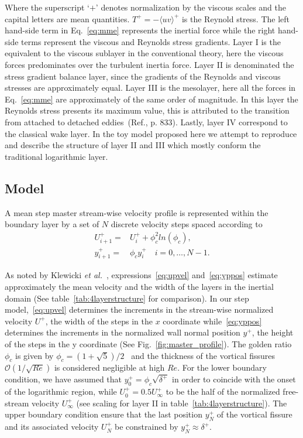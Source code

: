 \documentclass[aps,reprint,amsmath,amssymb,pra]{revtex4-1}%
\begin{document}
Where the superscript `$+$' denotes normalization by the viscous scales and the capital letters are mean quantities. $T^+=-\langle u v \rangle^+$ is the Reynold stress. The left hand-side term in Eq.~\ref{eq:mme} represents the inertial force while the right hand-side terms represent the viscous and Reynolds stress gradients.
Layer I is the equivalent to the viscous sublayer in the conventional theory, here the viscous forces predominates over the turbulent inertia force. Layer II is denominated the stress gradient balance layer, since  the gradients of the Reynolds and viscous stresses are approximately equal. Layer III is the mesolayer, here all the forces in Eq.~\ref{eq:mme} are approximately of the same order of magnitude. In this layer the Reynolds stress presents its maximum value, this is attributed to the transition from attached to detached eddies~(Ref.\citep{Klewickimmb}, p. 833). Lastly, layer IV correspond to the classical wake layer. In the toy model proposed here we attempt to reproduce and describe the structure of layer II and III which mostly conform the traditional logarithmic layer.

\subsection{Model\label{subsec:toymodel}}
A  mean step master stream-wise velocity profile is represented within the boundary layer by a set of $N$ discrete velocity steps spaced according to  
\begin{align}
U^+_{i+1}=&U^+_i+\phi_c^2 ln(\phi_c) \label{eq:upvel},\\
y^+_{i+1}=&\phi_c y^+_i\quad i=0,\ldots ,N-1. \label{eq:yppos}
\end{align}

As noted by Klewicki \textit{et al.}~\cite{klewicki2014}, expressions~\eqref{eq:upvel} and~\eqref{eq:yppos} estimate approximately the mean velocity and the width of the layers in the inertial domain (See table~\ref{tab:4layerstructure} for comparison). In our step model,~\eqref{eq:upvel} determines the increments in the stream-wise normalized velocity $U^+$, the width of the steps in the $x$ coordinate while~\eqref{eq:yppos} determines the increments in the normalized wall normal position $y^+$, the height of the steps in the y coordinate (See Fig.~\ref{fig:master_profile}). The golden ratio $\phi_c$ is given by $\phi_c=(1+\sqrt{5})/2$~\cite{klewicki2014} and the thickness of the vortical fissures $\mathcal{O}(1/\sqrt{Re})$ is considered negligible at high $Re$. For the lower boundary condition, we have assumed that $y^+_0=\phi_c\sqrt{\delta^+}$ in order to coincide with the onset of the logarithmic region, while $U^+_0=0.5 U_{\infty}^+$ to be the half of the normalized free-stream velocity $U_{\infty}^+$ (see scaling for layer II in table~\ref{tab:4layerstructure}).
The upper boundary condition ensure that the last position $y_{N}^+$ of the vortical fissure and its associated velocity $U^+_{N}$ be constrained by $y_{N}^+\approx\delta^+$.
\end{document}
